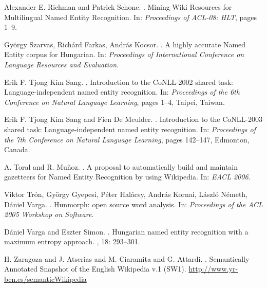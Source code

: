 \documentclass[11pt]{article}
\begin{document}
\begin{thebibliography}{}
Alexander E. Richman and Patrick Schone.
.
\newblock Mining Wiki Resources for Multilingual Named Entity Recognition.
\newblock In: {\em Proceedings of ACL-08: HLT}, pages 1--9.

György Szarvas, Richárd Farkas, András Kocsor.
.
\newblock A highly accurate Named Entity corpus for Hungarian. 
\newblock In: {\em Proceedings of International Conference on Language Resources and Evaluation}.

Erik F. Tjong Kim Sang.
.
\newblock Introduction to the CoNLL-2002 shared task: Language-independent named entity recognition.
\newblock In: {\em Proceedings of the 6th Conference on Natural Language Learning}, pages 1--4, Taipei, Taiwan.

Erik F. Tjong Kim Sang and Fien De Meulder.
.
\newblock Introduction to the CoNLL-2003 shared task: Language-independent named entity recognition. 
\newblock In: {\em Proceedings of the 7th Conference on Natural Language Learning}, pages 142--147, Edmonton, Canada.

A. Toral and R. Mu\~noz.
.
\newblock A proposal to automatically build and maintain gazetteers for Named Entity Recognition by using Wikipedia.
\newblock In: {\em EACL 2006}.

Viktor Trón, György Gyepesi, Péter Halácsy, András Kornai, László Németh, Dániel Varga.
.
\newblock Hunmorph: open source word analysis.
\newblock In: {\em Proceedings of the ACL 2005 Workshop on Software}. 

Dániel Varga and Eszter Simon.
.
\newblock Hungarian named entity recognition with a maximum entropy approach.
, 18: 293--301.

H. Zaragoza and J. Atserias and M. Ciaramita and G. Attardi.
.
\newblock Semantically Annotated Snapshot of the English Wikipedia v.1 (SW1).
\newblock \url{http://www.yr-bcn.es/semanticWikipedia}


\end{thebibliography}
\end{document}
